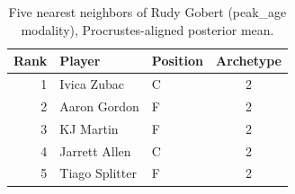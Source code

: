 \begin{table}[htbp]
  \centering\small
  \begin{tabular}{rllc}
    \toprule
    Rank & Player & Position & Archetype \\
    \midrule
    1 & Ivica Zubac & C & 2 \\
    2 & Aaron Gordon & F & 2 \\
    3 & KJ Martin & F & 2 \\
    4 & Jarrett Allen & C & 2 \\
    5 & Tiago Splitter & F & 2 \\
    \bottomrule
  \end{tabular}
  \caption{Five nearest neighbors of Rudy Gobert (peak_age modality), Procrustes-aligned posterior mean.}
  \label{tab:Rudy_Gobert_neighbors_peak_age}
\end{table}

